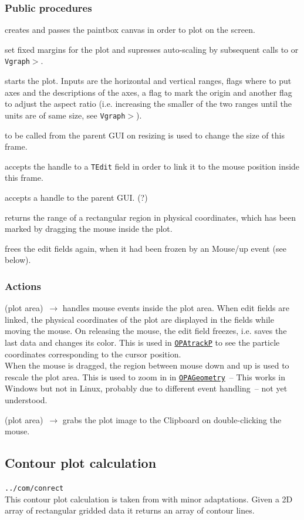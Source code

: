 \documentclass[12pt]{article}
\newcommand\code[1]{{\tt #1}}
\newcommand{\ofldx}[1]{\colorbox{black!15}{(#1)}}
\newcommand\guifco[1]{{\color{violet}\code{#1}}}
\newcommand{\evcodxf}[2]{\ofldx{#1}~$\rightarrow$ \guifco{#2}}
\newcommand{\gfcod}[2]{\opaguif{#1}$>$\guifco{#2}}
\newcommand{\opagui}[1]{\colorbox{blue!20}{\code{#1}}}
\newcommand{\ogui}[1]{\hyperref[#1]{\opagui{#1}}}
\newcommand{\opaguif}[1]{\colorbox{violet!30}{\code{#1}}}
\newcommand{\opauni}[1]{\colorbox{orange!30}{\code{#1}}}
\newcommand{\ounih}[2]{\subsection{\label{#2}#1}{\Huge\opauni{#2}}\\}
\newcommand{\desc}[1]{#1}
\newcommand{\act}[1]{\subsubsection*{Actions} #1}
\newcommand{\ppro}[1]{\subsubsection*{Public procedures} #1}
\newcommand{\todo}[1]{{\color{red} #1}}
\begin{document}
\ppro{

\guifco{assignScreen} creates \guifco{Vplot} and passes the paintbox canvas in order to plot on the screen.

\guifco{forceMargin*} set fixed margins for the plot and supresses auto-scaling by subsequent calls to \guifco{Init} or \gfcod{Vgraph}{Axis}.

\guifco{Init} starts the plot. Inputs are the horizontal and vertical ranges, flags where to put axes and the descriptions of the axes, a flag to mark the origin and another flag to adjust the aspect ratio (i.e. increasing the smaller of the two ranges until the units are of same size, see \gfcod{Vgraph}{AdjustAspectRatio}).

\guifco{SetSize} to be called from the parent GUI on resizing is used to change the size of this frame.

\guifco{PassEditHandle*} accepts the handle to a \code{TEdit} field in order to link it to the mouse position inside this frame.

\guifco{PassFormHandle} accepts a handle to the parent GUI. \todo{(?)}

\guifco{GetRange} returns the range of a rectangular region in physical coordinates, which has been marked by dragging the mouse inside the plot.

\guifco{UnfreezeEdit} frees the edit fields again, when it had been frozen by an Mouse/up event (see below).
}


\act{
\evcodxf{plot area}{pMouseDown,pMouseMove,pMouseUp} handles mouse events inside the plot area.
When edit fields are linked, the physical coordinates of the plot are displayed in the fields while moving the mouse. On releasing the mouse, the edit field freezes, i.e. saves the last data and changes its color.
This is used in \ogui{OPAtrackP} %
to see the particle coordinates corresponding to the cursor position. \\
When the mouse is dragged, the region between mouse down and up is used to rescale the plot area. This is used to zoom in in \ogui{OPAGeometry}~-- \todo{This works in Windows but not in Linux, probably due to different event handling~-- not yet understood.}

\evcodxf{plot area}{pDblClick} grabs the plot image to the Clipboard on double-clicking the mouse.
}



\ounih{Contour plot calculation}{../com/conrect}

\desc{This contour plot calculation is taken from \cite{CONRECT} with minor adaptations. Given a 2D array of rectangular gridded data it returns an array of contour lines.}
\end{document}
